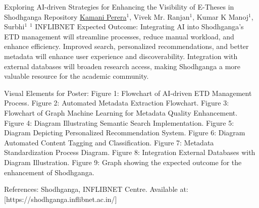 \begin{abstract_online}{Exploring AI-driven Strategies for Enhancing the Visibility of E-Theses in Shodhganga Repository}{%
    \underline{Kamani Perera}$^{1}$, Vivek Mr. Ranjan$^{1}$, Kumar K Manoj$^{1}$, Surbhi$^{1}$}{%
    }{
    $^1$ INFLIBNET%
}
	Expected Outcome: Integrating AI into Shodhganga’s ETD management will streamline processes, reduce manual workload, and enhance efficiency. Improved search, personalized recommendations, and better metadata will enhance user experience and discoverability. Integration with external databases will broaden research access, making Shodhganga a more valuable resource for the academic community.

	Visual Elements for Poster:
Figure 1: Flowchart of AI-driven ETD Management Process.
Figure 2: Automated Metadata Extraction Flowchart.
Figure 3: Flowchart of Graph Machine Learning for Metadata Quality Enhancement.
Figure 4: Diagram Illustrating Semantic Search Implementation.
Figure 5: Diagram Depicting Personalized Recommendation System.
Figure 6: Diagram Automated Content Tagging and Classification.
Figure 7: Metadata Standardization Process Diagram.
Figure 8: Integration External Databases with Diagram Illustration.
Figure 9: Graph showing the expected outcome for the enhancement of Shodhganga.

	References: Shodhganga, INFLIBNET Centre. Available at: [https://shodhganga.inflibnet.ac.in/]

\end{abstract_online}

